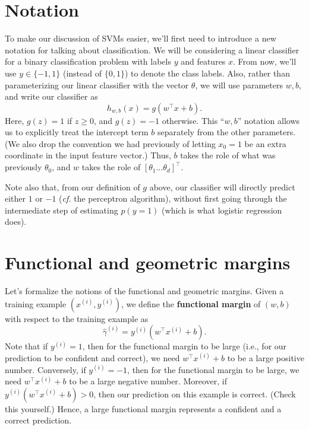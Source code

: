 \section{Notation}
To make our discussion of SVMs easier, we'll first need to introduce a new
notation for talking about classification. We will be considering a linear
classifier for a binary classification problem with labels $y$ and features $x$.
From now, we'll use $y \in \{-1,1\}$ (instead of $\{0,1\}$) to denote the class labels.
Also, rather than parameterizing our linear classifier with the vector $\theta$, we
will use parameters $w,b$, and write our classifier as
\begin{equation*}
    h_{w,b} (x) = g(w^\top x + b).    
\end{equation*}
Here, $g(z) = 1$ if $z \ge 0$, and $g(z) = -1$ otherwise. This ``$w,b$'' notation
allows us to explicitly treat the intercept term $b$ separately from the other
parameters. (We also drop the convention we had previously of letting $x_0 = 1$
be an extra coordinate in the input feature vector.) Thus, $b$ takes the role of
what was previously $\theta_0$, and $w$ takes the role of $[\theta_1 \ldots \theta_d]^\top$.

Note also that, from our definition of $g$ above, our classifier will directly
predict either $1$ or $-1$ (\textit{cf.} the perceptron algorithm), without first going %
through the intermediate step of estimating $p(y = 1)$ (which is what logistic
regression does).

\section{Functional and geometric margins}\label{sec:margins}
Let's formalize the notions of the functional and geometric margins. Given a
training example $(x^{(i)} ,y^{(i)} )$, we define the \textbf{functional margin} of $(w,b)$ with
respect to the training example as
\begin{equation*}
    \hat{\gamma}^{(i)} = y^{(i)} (w^\top x^{(i)} + b).
\end{equation*}
Note that if $y^{(i)} = 1$, then for the functional margin to be large (i.e., for
our prediction to be confident and correct), we need $w^\top x^{(i)} + b$ to be a large
positive number. Conversely, if $y^{(i)} = -1$, then for the functional margin
to be large, we need $w^\top x^{(i)} + b$ to be a large negative number. Moreover, if
$y^{(i)} (w^\top x^{(i)} + b) > 0$, then our prediction on this example is correct. (Check
this yourself.) Hence, a large functional margin represents a confident and a
correct prediction.


